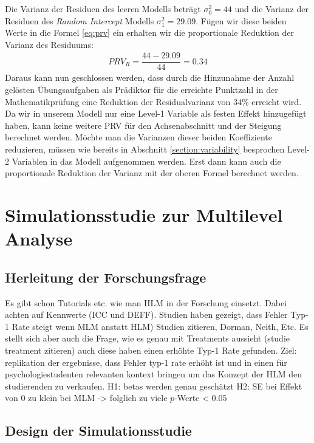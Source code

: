 \documentclass[12pt]{article}\usepackage[]{graphicx}\usepackage[]{color}
\begin{document}

Die Varianz der Residuen des leeren Modells beträgt $\sigma_{0}^2 = 44$ und die Varianz der Residuen des \textit{Random Intercept} Modells $\sigma_{1}^2 = 29.09$. Fügen wir diese beiden Werte in die Formel \eqref{eq:prv} ein erhalten wir die proportionale Reduktion der Varianz des Residuums:
\begin{equation} 
\begin{split}	
 PRV_{R} = \dfrac{44 - 29.09}{44} = 0.34
\end{split}	
\end{equation}
Daraus kann nun geschlossen werden, dass durch die Hinzunahme der Anzahl gelösten Übungsaufgaben als Prädiktor für die erreichte Punktzahl in der Mathematikprüfung eine Reduktion der Residualvarianz von 34\% erreicht wird. Da wir in unserem Modell nur eine Level-1 Variable als festen Effekt hinzugefügt haben, kann keine weitere PRV für den Achsenabschnitt und der Steigung berechnet werden. Möchte man die Varianzen dieser beiden Koeffiziente reduzieren, müssen wie bereits in Abschnitt \ref{section:variability} besprochen Level-2 Variablen in das Modell aufgenommen werden. Erst dann kann auch die proportionale Reduktion der Varianz mit der oberen Formel berechnet werden.

\section{Simulationsstudie zur Multilevel Analyse}
\subsection{Herleitung der Forschungsfrage}
Es gibt schon Tutorials etc. wie man HLM in der Forschung einsetzt. Dabei achten auf Kennwerte (ICC und DEFF). Studien haben gezeigt, dass Fehler Typ-1 Rate steigt wenn MLM anstatt HLM) Studien zitieren, Dorman, Neith, Etc. Es stellt sich aber auch die Frage, wie es genau mit Treatments aussieht (studie treatment zitieren) auch diese haben einen erhöhte Typ-1 Rate gefunden. Ziel: replikation der ergebnisse, dass Fehler typ-1 rate erhöht ist und in einen für psychologiestudenten relevanten kontext bringen um das Konzept der HLM den studierenden zu verkaufen. 
H1: betas werden genau geschätzt
H2: SE bei Effekt von 0 zu klein bei MLM -> folglich zu viele $p$-Werte < 0.05
\subsection{Design der Simulationsstudie}
\end{document}
